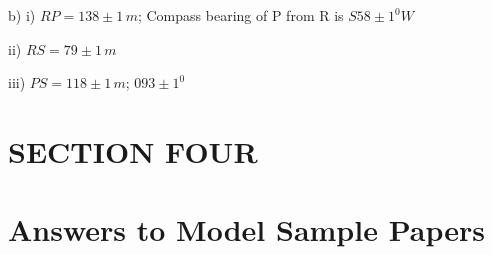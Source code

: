 \documentclass[
  a4paperpaper,
]{scrbook}
\begin{document}
\begin{tcolorbox}
\begin{enumerate}
  b) i) \(RP=138\pm1\,m\); Compass bearing of P from R is \(S58\pm1^0W\)

  ii) \(RS=79\pm1\,m\)

  iii) \(PS=118\pm1\,m\); \(093\pm1^0\)
\end{enumerate}

\hypertarget{section}{%
\subsection*{}\label{section}}

\end{tcolorbox}


\hypertarget{section-four}{%
\chapter*{SECTION FOUR}\label{section-four}}



\hypertarget{answers-to-model-sample-papers}{%
\chapter*{Answers to Model Sample
Papers}\label{answers-to-model-sample-papers}}

\end{document}
